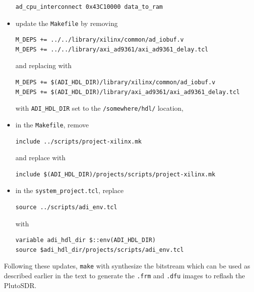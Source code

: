 \documentclass[12pt,oneside]{article}
\begin{document}
\begin{itemize}
{\begin{verbatim}
ad_cpu_interconnect 0x43C10000 data_to_ram
\end{verbatim}
}
\item update the {\tt Makefile} by removing
{\footnotesize
\begin{verbatim}
M_DEPS += ../../library/xilinx/common/ad_iobuf.v
M_DEPS += ../../library/axi_ad9361/axi_ad9361_delay.tcl
\end{verbatim}
}
and replacing with
{\footnotesize
\begin{verbatim}
M_DEPS += $(ADI_HDL_DIR)/library/xilinx/common/ad_iobuf.v
M_DEPS += $(ADI_HDL_DIR)/library/axi_ad9361/axi_ad9361_delay.tcl
\end{verbatim}
}
with {\tt ADI\_HDL\_DIR} set to the {\tt /somewhere/hdl/} location,
\item 
in the {\tt Makefile}, remove
{\footnotesize
\begin{verbatim}
include ../scripts/project-xilinx.mk
\end{verbatim}
}
and replace with
{\footnotesize
\begin{verbatim}
include $(ADI_HDL_DIR)/projects/scripts/project-xilinx.mk
\end{verbatim}
}
\item in the {\tt system\_project.tcl}, replace
{\footnotesize
\begin{verbatim}
source ../scripts/adi_env.tcl
\end{verbatim}
}
with
{\footnotesize
\begin{verbatim}
variable adi_hdl_dir $::env(ADI_HDL_DIR)
source $adi_hdl_dir/projects/scripts/adi_env.tcl
\end{verbatim}
}
\end{itemize}

Following these updates, {\tt make} with synthesize the bitstream which can be
used as described earlier in the text to generate the {\tt .frm} and {\tt .dfu}
images to reflash the PlutoSDR.
\end{document}
